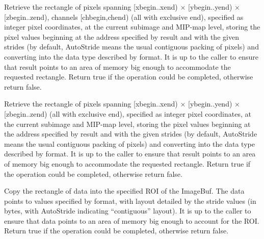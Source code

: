 Retrieve the rectangle of pixels spanning {\cf [xbegin..xend)} $\times$
{\cf [ybegin..yend)} $\times$ {\cf [zbegin..zend)}, channels 
{\cf [chbegin,chend)} (all with exclusive
end), specified as integer pixel coordinates, at the current subimage and
MIP-map level, storing the pixel values beginning at the address
specified by {\cf result} and with the given strides (by default,
{\cf AutoStride} means the usual contiguous packing of pixels) and
converting into the data type described by {\cf format}.  It is
up to the caller to ensure that {\cf result} points to an area of
memory big enough to accommodate the requested rectangle.
Return {\cf true} if the operation could be completed, otherwise
return {\cf false}.
\apiend


Retrieve the rectangle of pixels spanning {\cf [xbegin..xend)} $\times$
{\cf [ybegin..yend)} $\times$ {\cf [zbegin..zend)} (all with exclusive
end), specified as integer pixel coordinates, at the current subimage and
MIP-map level, storing the pixel values beginning at the address
specified by {\cf result} and with the given strides (by default,
{\cf AutoStride} means the usual contiguous packing of pixels) and
converting into the data type described by {\cf format}.  It is
up to the caller to ensure that {\cf result} points to an area of
memory big enough to accommodate the requested rectangle.
Return {\cf true} if the operation could be completed, otherwise
return {\cf false}.
\apiend

\NEW  %
Copy the rectangle of data into the specified ROI of the ImageBuf. The data
points to values specified by {\cf format}, with layout detailed by the
stride values (in bytes, with {\cf AutoStride} indicating ``contiguous''
layout). It is up to the caller to ensure that data points to an area of
memory big enough to account for the ROI. Return {\cf true} if the operation
could be completed, otherwise return {\cf false}.
\apiend



